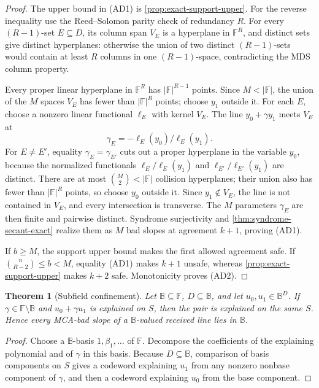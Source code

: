 \documentclass[12pt,a4paper]{amsart}
\numberwithin{equation}{section}
\newtheorem{theorem}{Theorem}[section]
\theoremstyle{remark}
\newcommand{\F}{\mathbb F}
\newcommand{\B}{\mathbb B}
\newcommand{\abs}[1]{\lvert #1\rvert}
\begin{document}
\begin{proof}
The upper bound in \textup{(AD1)} is
\cref{prop:exact-support-upper}.  For the reverse inequality use the
Reed--Solomon parity check of redundancy \(R\).  For every
\((R-1)\)-set \(E\subseteq D\), its column span \(V_E\) is a hyperplane
in \(\F^R\), and distinct sets give distinct hyperplanes: otherwise the
union of two distinct \((R-1)\)-sets would contain at least \(R\) columns
in one \((R-1)\)-space, contradicting the MDS column property.

Every proper linear hyperplane in \(\F^R\) has
\(\abs{\F}^{R-1}\) points.  Since \(M<\abs\F\), the union of the \(M\)
spaces \(V_E\) has fewer than \(\abs{\F}^{R}\) points; choose \(y_1\)
outside it.  For each \(E\),
choose a nonzero linear functional \(\ell_E\) with kernel \(V_E\).
The line \(y_0+\gamma y_1\) meets \(V_E\) at
\[
                 \gamma_E=-\ell_E(y_0)/\ell_E(y_1).
\]
For \(E\ne E'\), equality \(\gamma_E=\gamma_{E'}\) cuts out a proper
hyperplane in the variable \(y_0\), because the normalized functionals
\(\ell_E/\ell_E(y_1)\) and
\(\ell_{E'}/\ell_{E'}(y_1)\) are distinct.  There are at most
\(\binom M2<\abs\F\) collision hyperplanes; their union also has fewer
than \(\abs{\F}^{R}\) points, so choose \(y_0\) outside it.  Since
\(y_1\notin V_E\), the line is not contained in \(V_E\), and every
intersection is transverse.  The \(M\) parameters \(\gamma_E\) are then
finite and pairwise distinct.  Syndrome surjectivity and
\cref{thm:syndrome-secant-exact} realize them as \(M\) bad slopes at
agreement \(k+1\), proving \textup{(AD1)}.

If \(b\ge M\), the support upper bound makes the first allowed agreement
safe.  If \(\binom n{R-2}\le b<M\), equality \textup{(AD1)} makes
\(k+1\) unsafe, whereas
\cref{prop:exact-support-upper} makes \(k+2\) safe.  Monotonicity proves
\textup{(AD2)}.
\end{proof}

\begin{theorem}[Subfield confinement]\label{thm:subfield-confinement-full}
Let \(\B\subseteq\F\), \(D\subseteq\B\), and let \(u_0,u_1\in\B^D\).  If
\(\gamma\in\F\setminus\B\) and \(u_0+\gamma u_1\) is explained on \(S\),
then the pair is explained on the same \(S\).  Hence every MCA-bad slope of
a \(\B\)-valued received line lies in \(\B\).
\end{theorem}

\begin{proof}
Choose a \(\B\)-basis \(1,\beta_1,\ldots\) of \(\F\).  Decompose the
coefficients of the explaining polynomial and of \(\gamma\) in this basis.
Because \(D\subseteq\B\), comparison of basis components on \(S\) gives a
codeword explaining \(u_1\) from any nonzero nonbase component of
\(\gamma\), and then a codeword explaining \(u_0\) from the base component.
\end{proof}
\end{document}
